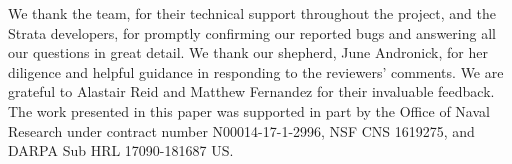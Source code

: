 \documentclass[sigplan,screen]{acmart}
\begin{document}

%

%
\maketitle










%

%


\begin{acks}
We thank the \K team, for their technical support throughout the project, and
the Strata developers, for promptly confirming our reported bugs
and answering all our questions in great detail.  We thank our shepherd,
June Andronick, for her diligence and helpful guidance in responding to the
reviewers' comments. We are grateful to Alastair Reid and Matthew Fernandez
for their invaluable feedback.
The work presented in this paper was supported in part by
the Office of Naval Research under contract number N00014-17-1-2996,
NSF CNS 1619275,
and DARPA Sub HRL 17090-181687 US.
\end{acks}

%
\balance




%
\end{document}
